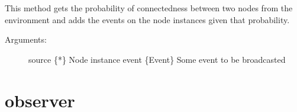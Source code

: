 \documentclass[letterpaper,10pt,english]{sphinxmanual}
\begin{document}
\begin{fulllineitems}
\begin{fulllineitems}
This method gets the probability of connectedness between two nodes
from the environment and adds the events on the node instances given
that probability.
\begin{description}
\item[{Arguments:}] \leavevmode
source \{*\} \textendash{} Node instance
event \{Event\} \textendash{} Some event to be broadcasted

\end{description}

\end{fulllineitems}


\end{fulllineitems}



\chapter{observer}
\label{\detokenize{index:module-observer}}\label{\detokenize{index:observer}}
\end{document}
